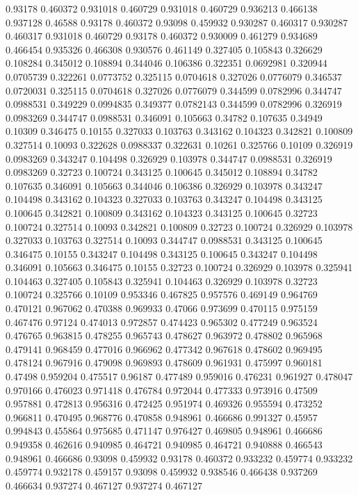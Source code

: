 0.93178 0.460372
0.931018 0.460729
0.931018 0.460729
0.936213 0.466138
0.937128 0.46588
0.93178 0.460372
0.93098 0.459932
0.930287 0.460317
0.930287 0.460317
0.931018 0.460729
0.93178 0.460372
0.930009 0.461279
0.934689 0.466454
0.935326 0.466308
0.930576 0.461149
0.327405 0.105843
0.326629 0.108284
0.345012 0.108894
0.344046 0.106386
0.322351 0.0692981
0.320944 0.0705739
0.322261 0.0773752
0.325115 0.0704618
0.327026 0.0776079
0.346537 0.0720031
0.325115 0.0704618
0.327026 0.0776079
0.344599 0.0782996
0.344747 0.0988531
0.349229 0.0994835
0.349377 0.0782143
0.344599 0.0782996
0.326919 0.0983269
0.344747 0.0988531
0.346091 0.105663
0.34782 0.107635
0.34949 0.10309
0.346475 0.10155
0.327033 0.103763
0.343162 0.104323
0.342821 0.100809
0.327514 0.10093
0.322628 0.0988337
0.322631 0.10261
0.325766 0.10109
0.326919 0.0983269
0.343247 0.104498
0.326929 0.103978
0.344747 0.0988531
0.326919 0.0983269
0.32723 0.100724
0.343125 0.100645
0.345012 0.108894
0.34782 0.107635
0.346091 0.105663
0.344046 0.106386
0.326929 0.103978
0.343247 0.104498
0.343162 0.104323
0.327033 0.103763
0.343247 0.104498
0.343125 0.100645
0.342821 0.100809
0.343162 0.104323
0.343125 0.100645
0.32723 0.100724
0.327514 0.10093
0.342821 0.100809
0.32723 0.100724
0.326929 0.103978
0.327033 0.103763
0.327514 0.10093
0.344747 0.0988531
0.343125 0.100645
0.346475 0.10155
0.343247 0.104498
0.343125 0.100645
0.343247 0.104498
0.346091 0.105663
0.346475 0.10155
0.32723 0.100724
0.326929 0.103978
0.325941 0.104463
0.327405 0.105843
0.325941 0.104463
0.326929 0.103978
0.32723 0.100724
0.325766 0.10109
0.953346 0.467825
0.957576 0.469149
0.964769 0.470121
0.967062 0.470388
0.969933 0.47066
0.973699 0.470115
0.975159 0.467476
0.97124 0.474013
0.972857 0.474423
0.965302 0.477249
0.963524 0.476765
0.963815 0.478255
0.965743 0.478627
0.963972 0.478802
0.965968 0.479141
0.968459 0.477016
0.966962 0.477342
0.967618 0.478602
0.969495 0.478124
0.967916 0.479098
0.969893 0.478609
0.961931 0.475997
0.960181 0.47498
0.959204 0.475517
0.96187 0.477489
0.959016 0.476231
0.961927 0.478047
0.970166 0.476023
0.971418 0.476784
0.972044 0.477333
0.973916 0.47509
0.957881 0.472813
0.956316 0.472425
0.951974 0.469326
0.955594 0.473252
0.966811 0.470495
0.968776 0.470858
0.948961 0.466686
0.991327 0.45957
0.994843 0.455864
0.975685 0.471147
0.976427 0.469805
0.948961 0.466686
0.949358 0.462616
0.940985 0.464721
0.940985 0.464721
0.940888 0.466543
0.948961 0.466686
0.93098 0.459932
0.93178 0.460372
0.933232 0.459774
0.933232 0.459774
0.932178 0.459157
0.93098 0.459932
0.938546 0.466438
0.937269 0.466634
0.937274 0.467127
0.937274 0.467127
